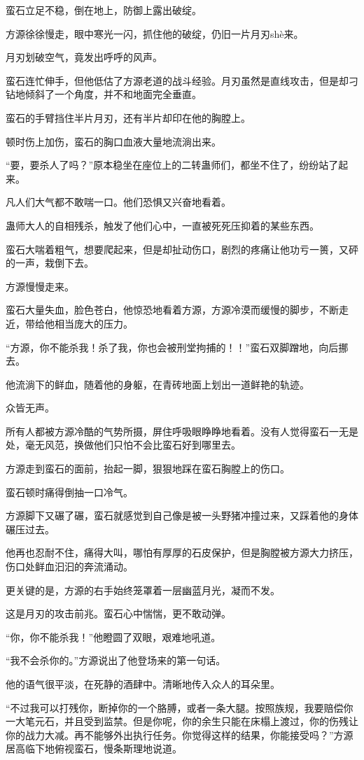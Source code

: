 \begin{this_body}
蛮石立足不稳，倒在地上，防御上露出破绽。

方源徐徐慢走，眼中寒光一闪，抓住他的破绽，仍旧一片月刃shè来。

月刃划破空气，竟发出呼呼的风声。

蛮石连忙伸手，但他低估了方源老道的战斗经验。月刃虽然是直线攻击，但是却刁钻地倾斜了一个角度，并不和地面完全垂直。

蛮石的手臂挡住半片月刃，还有半片却印在他的胸膛上。

顿时伤上加伤，蛮石的胸口血液大量地流淌出来。

“要，要杀人了吗？”原本稳坐在座位上的二转蛊师们，都坐不住了，纷纷站了起来。

凡人们大气都不敢喘一口。他们恐惧又兴奋地看着。

蛊师大人的自相残杀，触发了他们心中，一直被死死压抑着的某些东西。

蛮石大喘着粗气，想要爬起来，但是却扯动伤口，剧烈的疼痛让他功亏一篑，又砰的一声，栽倒下去。

方源慢慢走来。

蛮石大量失血，脸色苍白，他惊恐地看着方源，方源冷漠而缓慢的脚步，不断走近，带给他相当庞大的压力。

“方源，你不能杀我！杀了我，你也会被刑堂拘捕的！！”蛮石双脚蹭地，向后挪去。

他流淌下的鲜血，随着他的身躯，在青砖地面上划出一道鲜艳的轨迹。

众皆无声。

所有人都被方源冷酷的气势所摄，屏住呼吸眼睁睁地看着。没有人觉得蛮石一无是处，毫无风范，换做他们只怕不会比蛮石好到哪里去。

方源走到蛮石的面前，抬起一脚，狠狠地踩在蛮石胸膛上的伤口。

蛮石顿时痛得倒抽一口冷气。

方源脚下又碾了碾，蛮石就感觉到自己像是被一头野猪冲撞过来，又踩着他的身体碾压过去。

他再也忍耐不住，痛得大叫，哪怕有厚厚的石皮保护，但是胸膛被方源大力挤压，伤口处鲜血汩汩的奔流涌动。

更关键的是，方源的右手始终笼罩着一层幽蓝月光，凝而不发。

这是月刃的攻击前兆。蛮石心中惴惴，更不敢动弹。

“你，你不能杀我！”他瞪圆了双眼，艰难地吼道。

“我不会杀你的。”方源说出了他登场来的第一句话。

他的语气很平淡，在死静的酒肆中。清晰地传入众人的耳朵里。

“不过我可以打残你，断掉你的一个胳膊，或者一条大腿。按照族规，我要赔偿你一大笔元石，并且受到监禁。但是你呢，你的余生只能在床榻上渡过，你的伤残让你的战力大减。再不能够外出执行任务。你觉得这样的结果，你能接受吗？”方源居高临下地俯视蛮石，慢条斯理地说道。


\end{this_body}
